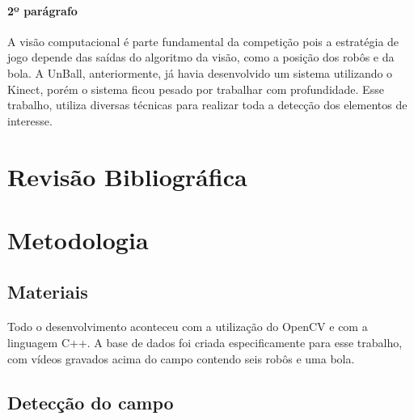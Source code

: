 \documentclass[conference, harvard, brazil, english]{sbatex}
\begin{document}
		\paragraph{2º parágrafo}
		A visão computacional é parte fundamental da competição pois a estratégia de jogo depende das saídas do algoritmo da visão, como a posição dos robôs e da bola. A UnBall, anteriormente, já havia desenvolvido um sistema utilizando o Kinect, porém o sistema ficou pesado por trabalhar com profundidade. Esse trabalho, utiliza diversas técnicas para realizar toda a detecção dos elementos de interesse.
		
	\section{Revisão Bibliográfica}
	
	\section{Metodologia}
		\subsection{Materiais}
		\paragraph{}Todo o desenvolvimento aconteceu com a utilização do OpenCV e com a linguagem C++. A base de dados foi criada especificamente para esse trabalho, com vídeos gravados acima do campo contendo seis robôs e uma bola.
		\subsection{Detecção do campo}
\end{document}
